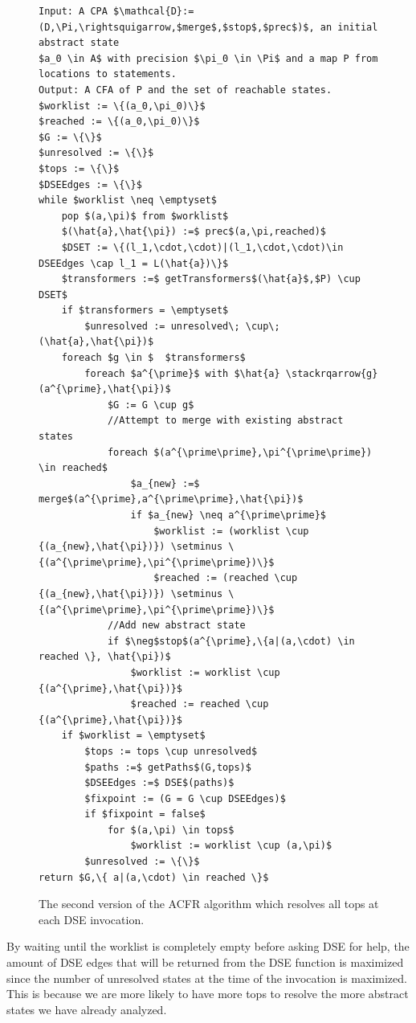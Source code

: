 \documentclass{kththesis}
\newcommand\stackrqarrow[1]{%
    \mathrel{\stackon[2pt]{$\rightsquigarrow$}{$\scriptscriptstyle#1$}}}
\begin{document}
\begin{figure}[htb]
    \centering
\begin{algorithmFrame}
\begin{lstlisting}[style=algorithm]
Input: A CPA $\mathcal{D}:=(D,\Pi,\rightsquigarrow,$merge$,$stop$,$prec$)$, an initial abstract state
$a_0 \in A$ with precision $\pi_0 \in \Pi$ and a map P from locations to statements.
Output: A CFA of P and the set of reachable states.
$worklist := \{(a_0,\pi_0)\}$
$reached := \{(a_0,\pi_0)\}$
$G := \{\}$
$unresolved := \{\}$
$tops := \{\}$
$DSEEdges := \{\}$
while $worklist \neq \emptyset$ 
    pop $(a,\pi)$ from $worklist$
    $(\hat{a},\hat{\pi}) :=$ prec$(a,\pi,reached)$
    $DSET := \{(l_1,\cdot,\cdot)|(l_1,\cdot,\cdot)\in DSEEdges \cap l_1 = L(\hat{a})\}$
    $transformers :=$ getTransformers$(\hat{a}$,$P) \cup DSET$
    if $transformers = \emptyset$
        $unresolved := unresolved\; \cup\; (\hat{a},\hat{\pi})$
    foreach $g \in $  $transformers$ 
        foreach $a^{\prime}$ with $\hat{a} \stackrqarrow{g} (a^{\prime},\hat{\pi})$
            $G := G \cup g$
            //Attempt to merge with existing abstract states
            foreach $(a^{\prime\prime},\pi^{\prime\prime}) \in reached$
                $a_{new} :=$ merge$(a^{\prime},a^{\prime\prime},\hat{\pi})$
                if $a_{new} \neq a^{\prime\prime}$
                    $worklist := (worklist \cup {(a_{new},\hat{\pi})}) \setminus \{(a^{\prime\prime},\pi^{\prime\prime})\}$
                    $reached := (reached \cup {(a_{new},\hat{\pi})}) \setminus \{(a^{\prime\prime},\pi^{\prime\prime})\}$
            //Add new abstract state
            if $\neg$stop$(a^{\prime},\{a|(a,\cdot) \in reached \}, \hat{\pi})$
                $worklist := worklist \cup {(a^{\prime},\hat{\pi})}$
                $reached := reached \cup {(a^{\prime},\hat{\pi})}$
    if $worklist = \emptyset$
        $tops := tops \cup unresolved$
        $paths :=$ getPaths$(G,tops)$
        $DSEEdges :=$ DSE$(paths)$
        $fixpoint := (G = G \cup DSEEdges)$
        if $fixpoint = false$
            for $(a,\pi) \in tops$
                $worklist := worklist \cup (a,\pi)$
        $unresolved := \{\}$
return $G,\{ a|(a,\cdot) \in reached \}$
\end{lstlisting}
\end{algorithmFrame}
\caption{The second version of the ACFR algorithm which resolves all tops at each DSE invocation.}
    \label{fig:ACFR2}
\end{figure}
\clearpage
\noindent
By waiting until the worklist is completely empty before asking DSE for help, the amount of DSE edges that will be returned from the DSE function is maximized since the number of unresolved states at the time of the invocation is maximized. This is because we are more likely to have more tops to resolve the more abstract states we have already analyzed.
\end{document}
